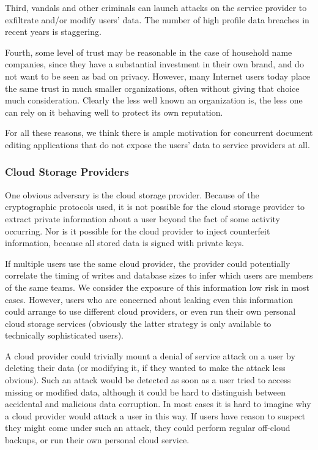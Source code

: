 \documentclass[pldi-cameraready,10pt]{sigplanconf-pldi16}
\begin{document}
Third, vandals and other criminals can launch attacks on the service provider to exfiltrate and/or modify users' data.
The number of high profile data breaches in recent years is staggering.

Fourth, some level of trust may be reasonable in the case of household name companies, since they have a substantial investment in their own brand, and do not want to be seen as bad on privacy.
However, many Internet users today place the same trust in much smaller organizations, often without giving that choice much consideration.
Clearly the less well known an organization is, the less one can rely on it behaving well to protect its own reputation.

For all these reasons, we think there is ample motivation for concurrent document editing applications that do not expose the users' data to service providers at all.

\subsubsection{Cloud Storage Providers}

One obvious adversary is the cloud storage provider.
Because of the cryptographic protocols used, it is not possible for the cloud storage provider to extract private information about a user beyond the fact of some activity occurring.
Nor is it possible for the cloud provider to inject counterfeit information, because all stored data is signed with private keys.

If multiple users use the same cloud provider, the provider could potentially correlate the timing of writes and database sizes to infer which users are members of the same teams.
We consider the exposure of this information low risk in most cases.
However, users who are concerned about leaking even this information could arrange to use different cloud providers, or even run their own personal cloud storage services (obviously the latter strategy is only available to technically sophisticated users).

A cloud provider could trivially mount a denial of service attack on a user by deleting their data (or modifying it, if they wanted to make the attack less obvious).
Such an attack would be detected as soon as a user tried to access missing or modified data, although it could be hard to distinguish between accidental and malicious data corruption.
In most cases it is hard to imagine why a cloud provider would attack a user in this way.
If users have reason to suspect they might come under such an attack, they could perform regular off-cloud backups, or run their own personal cloud service.
\end{document}
